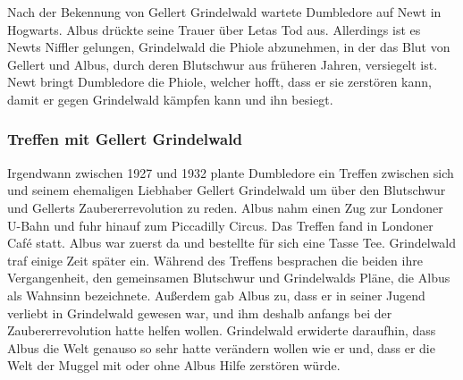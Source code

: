 \documentclass[a4paper, 10pt]{article}
\begin{document}
\vspace{10pt}
\newline
Nach der Bekennung von Gellert Grindelwald wartete Dumbledore auf Newt in Hogwarts. Albus drückte seine Trauer über Letas Tod aus. Allerdings ist es Newts Niffler gelungen, Grindelwald die Phiole abzunehmen, in der das Blut von Gellert und Albus, durch deren Blutschwur aus früheren Jahren, versiegelt ist. Newt bringt Dumbledore die Phiole, welcher hofft, dass er sie zerstören kann, damit er gegen Grindelwald kämpfen kann und ihn besiegt.

\subsubsection*{Treffen mit Gellert Grindelwald}
Irgendwann zwischen 1927 und 1932 plante Dumbledore ein Treffen zwischen sich und seinem ehemaligen Liebhaber Gellert Grindelwald um über den Blutschwur und Gellerts Zaubererrevolution zu reden. Albus nahm einen Zug zur Londoner U-Bahn und fuhr hinauf zum Piccadilly Circus. Das Treffen fand in Londoner Café statt. Albus war zuerst da und bestellte für sich eine Tasse Tee. Grindelwald traf einige Zeit später ein. Während des Treffens besprachen die beiden ihre Vergangenheit, den gemeinsamen Blutschwur und Grindelwalds Pläne, die Albus als Wahnsinn bezeichnete. Außerdem gab Albus zu, dass er in seiner Jugend verliebt in Grindelwald gewesen war, und ihm deshalb anfangs bei der Zaubererrevolution hatte helfen wollen. Grindelwald erwiderte daraufhin, dass Albus die Welt genauso so sehr hatte verändern wollen wie er und, dass er die Welt der Muggel mit oder ohne Albus Hilfe zerstören würde.
\end{document}
